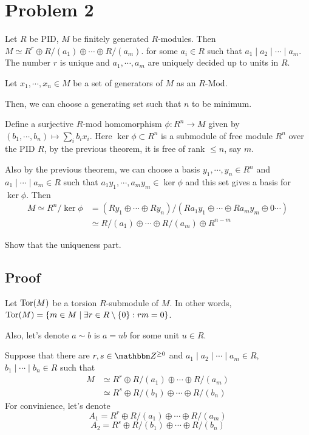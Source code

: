 \section*{Problem 2}

\begin{theorem}
  Let
  \(R\) be PID,
  \(M\) be finitely generated \(R\)-modules.
  Then
  \(M \simeq R^r \oplus R/(a_1) \oplus \cdots \oplus R/(a_m)\).
  for some \(a_i \in R\) such that \(a_1 \mid a_2 \mid \cdots \mid a_m\).
  The number \(r\) is unique and \(a_1, \cdots, a_m\) are uniquely
  decided up to units in \(R\).
\end{theorem}

Let \(x_1, \cdots, x_n \in M\) be a set of generators of \(M\) as an \(R\)-Mod.

Then, we can choose a generating set such that \(n\) to be minimum.

Define a surjective \(R\)-mod homomorphism \(\phi: R^n \to M\)
given by \((b_1, \cdots, b_n) \mapsto \sum_i b_ix_i\).
Here \(\ker \phi \subset R^n\) is a submodule of free module \(R^n\)
over the PID \(R\),
by the previous theorem,
it is free of rank \(\le n\), say \(m\).

Also by the previous theorem,
we can choose a basis \(y_1, \cdots, y_n \in R^n\)
and \(a_1 \mid \cdots \mid a_m \in R\)
such that \(a_1y_1, \cdots, a_my_m \in \ker \phi\)
and this set gives a basis for \(\ker \phi\).
Then
\begin{align*}
  M \simeq R^n / \ker\phi
  &= (Ry_1 \oplus \cdots \oplus Ry_n) / (Ra_1y_1 \oplus \cdots \oplus Ra_my_m \oplus 0 \cdots)
  \\&\simeq R/(a_1) \oplus \cdots \oplus R/(a_m) \oplus R^{n - m}
\end{align*}

Show that the uniqueness part.

\subsection*{Proof}

Let \(\textnormal{Tor}(M)\) be a torsion \(R\)-submodule of \(M\).
In other words,
\(\textnormal{Tor}(M) = \{m \in M \mid \exists r \in R \setminus \{0\}: rm = 0\}\).

Also, let's denote \(a \sim b\) is \(a = ub\) for some unit \(u \in R\).

Suppose that there are
\(r, s \in \bbZ^{\ge 0}\)
and \(a_1 \mid a_2 \mid \cdots \mid a_m \in R\),
\(b_1 \mid \cdots \mid b_n \in R\)
such that
\begin{align*}
  M &\simeq R^r \oplus R/(a_1) \oplus \cdots \oplus R/(a_m)
  \\&\simeq R^s \oplus R/(b_1) \oplus \cdots \oplus R/(b_n)
\end{align*}
For convinience, let's denote
\[A_1 = R^r \oplus R/(a_1) \oplus \cdots \oplus R/(a_m)\]
\[A_2 = R^s \oplus R/(b_1) \oplus \cdots \oplus R/(b_n)\]

